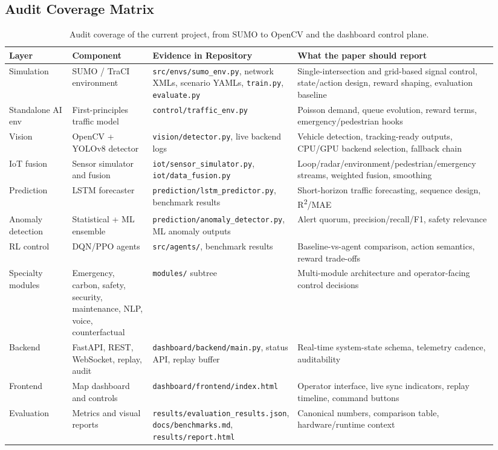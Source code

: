 \documentclass[conference]{IEEEtran}
\begin{document}
\subsection{Audit Coverage Matrix}
\begin{table}[t]
\centering
\caption{Audit coverage of the current project, from SUMO to OpenCV and the dashboard control plane.}
\label{tab:audit-coverage}
\begin{tabular}{p{0.14\linewidth} p{0.18\linewidth} p{0.20\linewidth} p{0.42\linewidth}}
\toprule
\textbf{Layer} & \textbf{Component} & \textbf{Evidence in Repository} & \textbf{What the paper should report} \\
\midrule
Simulation & SUMO / TraCI environment & \texttt{src/envs/sumo\_env.py}, network XMLs, scenario YAMLs, \texttt{train.py}, \texttt{evaluate.py} & Single-intersection and grid-based signal control, state/action design, reward shaping, evaluation baseline \\
Standalone AI env & First-principles traffic model & \texttt{control/traffic\_env.py} & Poisson demand, queue evolution, reward terms, emergency/pedestrian hooks \\
Vision & OpenCV + YOLOv8 detector & \texttt{vision/detector.py}, live backend logs & Vehicle detection, tracking-ready outputs, CPU/GPU backend selection, fallback chain \\
IoT fusion & Sensor simulator and fusion & \texttt{iot/sensor\_simulator.py}, \texttt{iot/data\_fusion.py} & Loop/radar/environment/pedestrian/emergency streams, weighted fusion, smoothing \\
Prediction & LSTM forecaster & \texttt{prediction/lstm\_predictor.py}, benchmark results & Short-horizon traffic forecasting, sequence design, R\textsuperscript{2}/MAE \\
Anomaly detection & Statistical + ML ensemble & \texttt{prediction/anomaly\_detector.py}, ML anomaly outputs & Alert quorum, precision/recall/F1, safety relevance \\
RL control & DQN/PPO agents & \texttt{src/agents/}, benchmark results & Baseline-vs-agent comparison, action semantics, reward trade-offs \\
Specialty modules & Emergency, carbon, safety, security, maintenance, NLP, voice, counterfactual & \texttt{modules/} subtree & Multi-module architecture and operator-facing control decisions \\
Backend & FastAPI, REST, WebSocket, replay, audit & \texttt{dashboard/backend/main.py}, status API, replay buffer & Real-time system-state schema, telemetry cadence, auditability \\
Frontend & Map dashboard and controls & \texttt{dashboard/frontend/index.html} & Operator interface, live sync indicators, replay timeline, command buttons \\
Evaluation & Metrics and visual reports & \texttt{results/evaluation\_results.json}, \texttt{docs/benchmarks.md}, \texttt{results/report.html} & Canonical numbers, comparison table, hardware/runtime context \\
\bottomrule
\end{tabular}
\end{table}
\end{document}
